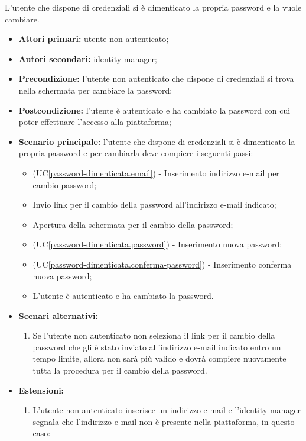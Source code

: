 L'utente che dispone di credenziali si è dimenticato la propria password e la vuole cambiare.
\begin{itemize}
    \item \textbf{Attori primari:} utente non autenticato;
    \item \textbf{Autori secondari:} identity manager;
    \item \textbf{Precondizione:} l'utente non autenticato che dispone di credenziali si trova nella schermata per cambiare la password;
    \item \textbf{Postcondizione:} l'utente è autenticato e ha cambiato la password con cui poter effettuare l'accesso alla piattaforma;
    \item \textbf{Scenario principale:} l'utente che dispone di credenziali si è dimenticato la propria password e per cambiarla deve compiere i seguenti passi:
    \begin{itemize}
        \item (UC\ref{password-dimenticata.email}) - Inserimento indirizzo e-mail per cambio password;
        \item Invio link per il cambio della password all'indirizzo e-mail indicato;
        \item Apertura della schermata per il cambio della password;
        \item (UC\ref{password-dimenticata.password}) - Inserimento nuova password;
        \item (UC\ref{password-dimenticata.conferma-password}) - Inserimento conferma nuova password;
        \item L'utente è autenticato e ha cambiato la password.
    \end{itemize}
	\item \textbf{Scenari alternativi:}
	\begin{enumerate}[label=\lett]
		\item Se l'utente non autenticato non seleziona il link per il cambio della password che gli è stato inviato all'indirizzo e-mail indicato entro un tempo limite, allora non sarà più valido e dovrà compiere nuovamente tutta la procedura per il cambio della password. 
	\end{enumerate}
	\item \textbf{Estensioni:}
	\begin{enumerate}[label=\lett]
		\item L'utente non autenticato inserisce un indirizzo e-mail e l'identity manager segnala che l'indirizzo e-mail non è presente nella piattaforma, in questo caso:

\end{enumerate}
\end{itemize}
